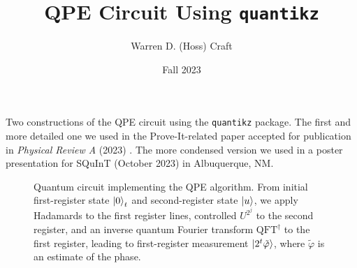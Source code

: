 \documentclass{article}
\title{QPE Circuit Using \texttt{quantikz}}
\author{Warren D. (Hoss) Craft}
\date{Fall 2023}
\begin{document}
\maketitle

\flushleft

Two constructions of the QPE circuit using the \texttt{quantikz} package. The first and more detailed one we used in the Prove-It-related paper accepted for publication in \textit{Physical Review A} (2023) \cite{Witzel_et_al:2023_PRA_verifying_QPE, witzel_et_al:2023_arXiv_verifying_QPE}. The more condensed version we used in a poster presentation for SQuInT (October 2023) \cite{witzel_et_al:2023_SQuInT_verifying_QPE} in Albuquerque, NM.


\begin{figure*}[htb]
    \captionsetup{font=small}
    \centerline{
    }
    \caption{Quantum circuit implementing the QPE algorithm. From initial first-register state $\ket{0}_{t}$ and second-register state $\ket{u}$, we apply Hadamards to the first register lines, controlled $U^{2^j}$ to the second register, and an inverse quantum Fourier transform $\text{QFT}^{\dagger}$ to the first register, leading to first-register measurement $\ket{2^t \tilde{\varphi}}$, where $\tilde{\varphi}$ is an estimate of the phase.}
    \label{fig:QPE_circuit}
\end{figure*}
\end{document}
